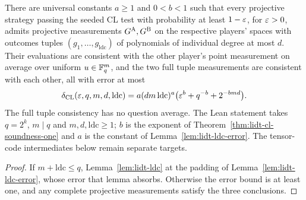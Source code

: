 \begin{theorem}
\label{thm:lidt-cl-soundness}
\leanok
There are universal constants $a\geq 1$ and $0<b<1$ such that every projective
strategy passing the seeded CL test with probability at least $1-\varepsilon$, for
$\varepsilon>0$, admits projective measurements $G^{\textsc{A}},G^{\textsc{B}}$ on the respective
players' spaces with outcomes tuples $(g_1,\ldots,g_{\mathrm{ldc}})$ of polynomials
of individual degree at most $d$. Their evaluations are consistent with the other
player's point measurement on average over uniform $u\in\mathbb{F}_q^m$, and the two
full tuple measurements are consistent with each other, all with error at most
\[
  \delta_{\mathrm{CL}}(\varepsilon,q,m,d,\mathrm{ldc})
  = a(dm\,\mathrm{ldc})^a\bigl(\varepsilon^b+q^{-b}+2^{-bmd}\bigr).
\]
The full tuple consistency has no question average. The Lean statement takes $q=2^k$,
$m\mid q$ and $m,d,\mathrm{ldc}\geq1$; $b$ is the exponent of
Theorem~\ref{thm:lidt-cl-soundness-one} and $a$ is the constant of
Lemma~\ref{lem:lidt-ldc-error}. The tensor-code intermediates below remain separate targets.
\end{theorem}

\begin{proof}
\leanok
{}
If $m+\mathrm{ldc}\leq q$, Lemma~\ref{lem:lidt-ldc} at the padding of
Lemma~\ref{lem:lidt-ldc-error}, whose error that lemma absorbs. Otherwise the error bound is at
least one, and any complete projective measurements satisfy the three conclusions.
\end{proof}

